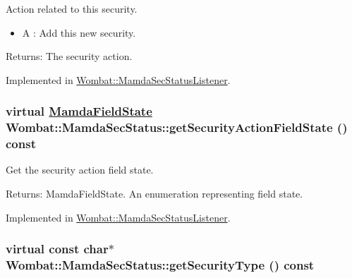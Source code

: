 Action related to this security. 

\begin{itemize}
\item A : Add this new security. \end{itemize}


\begin{Desc}
\item[Returns:]The security action. \end{Desc}


Implemented in \hyperlink{classWombat_1_1MamdaSecStatusListener_a0180f033edd189426cb0c7386f9fb4b}{Wombat::Mamda\-Sec\-Status\-Listener}.\hypertarget{classWombat_1_1MamdaSecStatus_771481bb771bdd1bb86ab54be9e9247b}{
\subsubsection[getSecurityActionFieldState]{\setlength{\rightskip}{0pt plus 5cm}virtual \hyperlink{namespaceWombat_93aac974f2ab713554fd12a1fa3b7d2a}{Mamda\-Field\-State} Wombat::Mamda\-Sec\-Status::get\-Security\-Action\-Field\-State () const}}
\label{classWombat_1_1MamdaSecStatus_771481bb771bdd1bb86ab54be9e9247b}


Get the security action field state. 

\begin{Desc}
\item[Returns:]Mamda\-Field\-State. An enumeration representing field state. \end{Desc}


Implemented in \hyperlink{classWombat_1_1MamdaSecStatusListener_3a220f61dbc73b122840f7f3986d2b9c}{Wombat::Mamda\-Sec\-Status\-Listener}.\hypertarget{classWombat_1_1MamdaSecStatus_d3f39139bb90453ba077440f838b3d70}{
\subsubsection[getSecurityType]{\setlength{\rightskip}{0pt plus 5cm}virtual const char$\ast$ Wombat::Mamda\-Sec\-Status::get\-Security\-Type () const}}
\label{classWombat_1_1MamdaSecStatus_d3f39139bb90453ba077440f838b3d70}


